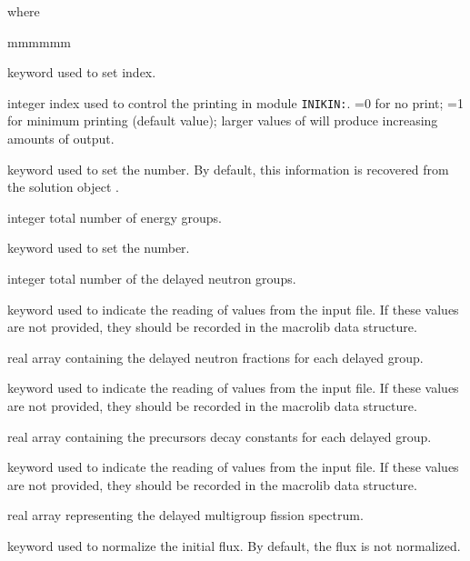 \noindent where
\begin{ListeDeDescription}{mmmmmm}

\item[\moc{EDIT}] keyword used to set  index.

\item[\dusa{iprint}] integer index used to control  the printing in module {\tt INIKIN:}.
=0 for no print; =1 for minimum printing (default value); larger values of 
will produce increasing amounts of output.

\item[\moc{NGRP}] keyword used to set the  number. By default, this information is recovered from the solution object
.

\item[\dusa{ngrp}] integer total number of energy groups.

\item[\moc{NDEL}] keyword used to set the  number.

\item[\dusa{ndg}] integer total number of the delayed neutron groups.

\item[\moc{BETA}] keyword used to indicate the reading of  values from the input file.
If these values are not provided, they should be recorded in the {\sc macrolib} data structure.

\item[\dusa{beta}] real array containing the delayed neutron fractions for each delayed group.

\item[\moc{LAMBDA}] keyword used to indicate the reading of  values from the input file.
If these values are not provided, they should be recorded in the {\sc macrolib} data structure.

\item[\dusa{lambda}] real array containing the precursors decay constants for each delayed group.

\item[\moc{CHID}] keyword used to indicate the reading of  values from the input file.
If these values are not provided, they should be recorded in the {\sc macrolib} data structure.

\item[\dusa{chid}] real array representing the delayed multigroup fission spectrum.

\item[\moc{NORM}] keyword used to normalize the initial flux. By default, the flux is not normalized.


\end{ListeDeDescription}
